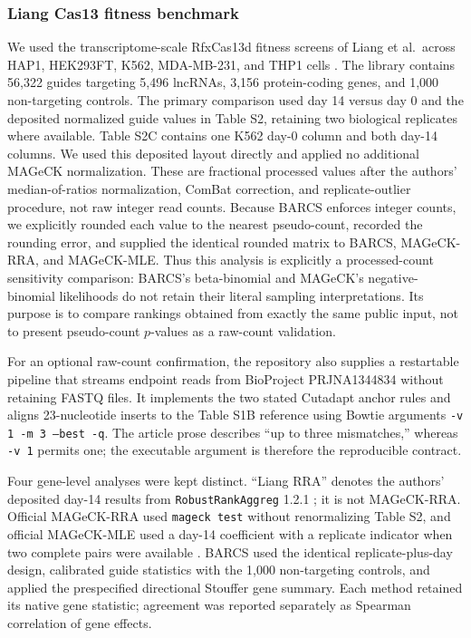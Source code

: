 \subsubsection{Liang Cas13 fitness benchmark}

We used the transcriptome-scale RfxCas13d fitness screens of Liang
et al.\ across HAP1, HEK293FT, K562, MDA-MB-231, and THP1 cells
\citep{liang2026lncrna}.  The library contains 56,322 guides targeting 5,496
lncRNAs, 3,156 protein-coding genes, and 1,000 non-targeting controls.
The primary comparison used day 14 versus day 0 and the deposited normalized
guide values in Table S2, retaining two biological replicates where available.
Table S2C contains one K562 day-0 column and both day-14 columns.  We used this
deposited layout directly and applied no additional MAGeCK normalization.
These are fractional processed values after the authors' median-of-ratios
normalization, ComBat correction, and replicate-outlier procedure, not raw
integer read counts.  Because BARCS enforces integer counts, we explicitly
rounded each value to the nearest pseudo-count, recorded the rounding error,
and supplied the identical rounded matrix to BARCS, MAGeCK-RRA, and
MAGeCK-MLE.  Thus this analysis is explicitly a processed-count sensitivity
comparison: BARCS's beta-binomial and MAGeCK's negative-binomial likelihoods
do not retain their literal sampling interpretations.  Its purpose is to
compare rankings obtained from exactly the same public input, not to present
pseudo-count $p$-values as a raw-count validation.

For an optional raw-count confirmation, the repository also supplies a
restartable pipeline that streams endpoint reads from BioProject
PRJNA1344834 without retaining FASTQ files.  It implements the two stated
Cutadapt anchor rules and aligns 23-nucleotide inserts to the Table S1B
reference using Bowtie arguments \texttt{-v 1 -m 3 --best -q}.  The article
prose describes ``up to three mismatches,'' whereas \texttt{-v 1} permits one;
the executable argument is therefore the reproducible contract.

Four gene-level analyses were kept distinct.  ``Liang RRA'' denotes the
authors' deposited day-14 results from \texttt{RobustRankAggreg} 1.2.1
\citep{kolde2012rra}; it is not MAGeCK-RRA.  Official MAGeCK-RRA used
\texttt{mageck test} without renormalizing Table S2, and official MAGeCK-MLE
used a day-14 coefficient with a
replicate indicator when two complete pairs were available
\citep{li2014mageck,li2015mageckvispr}.  BARCS used the identical
replicate-plus-day design, calibrated guide statistics with the 1,000
non-targeting controls, and applied the prespecified directional Stouffer
gene summary.  Each method retained its native gene statistic; agreement was
reported separately as Spearman correlation of gene effects.

